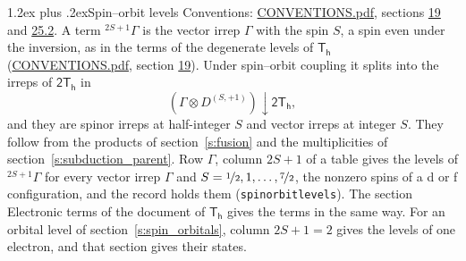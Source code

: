 \documentclass[10pt,a4paper]{article}
\makeatletter
\renewcommand\section{\@startsection{section}{1}{\z@}{-3ex plus -1ex minus -.2ex}%
  {1.2ex plus .2ex}{\normalfont\large\sffamily\bfseries\color{parttitle}}}
\numberwithin{equation}{section}
\newcommand{\grp}[1]{\mathsf{#1}}
\newcommand{\restr}[2]{#1\!\downarrow#2}
\newcommand{\irrJp}[2]{D^{(#1,#2)}}
\newcommand{\irrprod}{\otimes}
\newcommand{\term}[2]{{}^{#1}#2}
\makeatother
\begin{document}
\section{Spin--orbit levels}\label{s:spin_orbit}
Conventions: \href{../../CONVENTIONS.pdf}{CONVENTIONS.pdf}, sections \href{../../../rotation/CONVENTIONS.pdf\#conv.19}{19} and \href{../../CONVENTIONS.pdf\#conv.25.2}{25.2}.
\leavevmode\label{n:local.spin}\label{n:symbol.term}A term $\term{2S+1}{\Gamma}$ is the vector irrep $\Gamma$ with the spin $S$, a spin even under the inversion, as in the terms of the degenerate levels of \href{../../../rotation/data/pdf/Th.pdf}{$\grp{T_{h}}$} (\href{../../CONVENTIONS.pdf}{CONVENTIONS.pdf}, section \href{../../../rotation/CONVENTIONS.pdf\#conv.19}{19}). Under spin--orbit coupling it splits into the irreps of $\grp{2T_{h}}$ in
\begin{equation}\label{e:spinorbit}\restr{(\Gamma \irrprod \irrJp{S}{+1})}{\grp{2T_{h}}},\end{equation}
and they are spinor irreps at half-integer $S$ and vector irreps at integer $S$. They follow from the products of section~\ref{s:fusion} and the multiplicities of section~\ref{s:subduction_parent}. Row $\Gamma$, column $2S + 1$ of a table gives the levels of $\term{2S+1}{\Gamma}$ for every vector irrep $\Gamma$ and $S = \nicefrac{1}{2}, 1, \dots, \nicefrac{7}{2}$, the nonzero spins of a d or f configuration, and the record holds them (\texttt{spinorbitlevels}). The section Electronic terms of the document of \href{../../../rotation/data/pdf/Th.pdf}{$\grp{T_{h}}$} gives the terms in the same way. For an orbital level of section~\ref{s:spin_orbitals}, column $2S + 1 = 2$ gives the levels of one electron, and that section gives their states.
\end{document}
